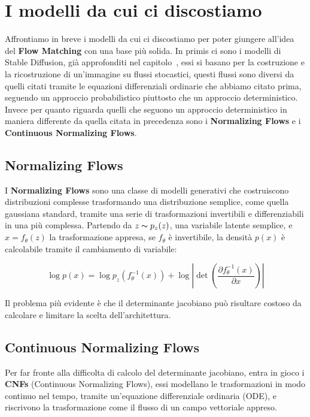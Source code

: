 \section{I modelli da cui ci discostiamo}

Affrontiamo in breve i modelli da cui ci discostiamo per poter giungere all'idea del \textbf{Flow Matching} con una base più solida. In primis ci sono i modelli di Stable Diffusion, già approfonditi nel capitolo~\label{chapter15}, essi si basano per la costruzione e la ricostruzione di un'immagine su flussi stocastici, questi flussi sono diversi da quelli citati tramite le equazioni differenziali ordinarie che abbiamo citato prima, seguendo un approccio probabilistico piuttosto che un approccio deterministico. Invece per quanto riguarda quelli che seguono un approccio deterministico in maniera differente da quella citata in precedenza sono i \textbf{Normalizing Flows} e i \textbf{Continuous Normalizing Flows}.

\subsection{Normalizing Flows}

I \textbf{Normalizing Flows} sono una classe di modelli generativi che costruiscono distribuzioni complesse trasformando una distribuzione semplice, come quella gaussiana standard, tramite una serie di trasformazioni invertibili e differenziabili in una più complessa. Partendo da $z \thicksim p_z(z)$, una variabile latente semplice, e $x = f_{\theta}(z)$ la trasformazione appresa, se $f_{\theta}$ è invertibile, la densità $p(x)$ è calcolabile tramite il cambiamento di variabile:

\begin{equation}
    \log p(x) = \log p_z(f_\theta^{-1}(x)) + \log \left|\det\left(\frac{\partial f_\theta^{-1}(x)}{\partial x}\right)\right|
\end{equation}

Il problema più evidente è che il determinante jacobiano può risultare costoso da calcolare e limitare la scelta dell'architettura.

\subsection{Continuous Normalizing Flows}

Per far fronte alla difficolta di calcolo del determinante jacobiano, entra in gioco i \textbf{CNFs} (Continuous Normalizing Flows), essi modellano le trasformazioni in modo continuo nel tempo, tramite un'equazione differenziale ordinaria (ODE), e riscrivono la trasformazione come il flusso di un campo vettoriale appreso.%

